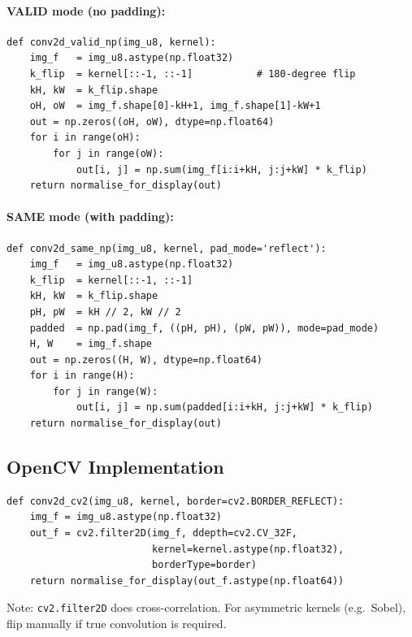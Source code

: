 \documentclass[12pt,a4paper]{article}
\begin{document}
\paragraph{VALID mode (no padding):}
\begin{lstlisting}
def conv2d_valid_np(img_u8, kernel):
    img_f   = img_u8.astype(np.float32)
    k_flip  = kernel[::-1, ::-1]           # 180-degree flip
    kH, kW  = k_flip.shape
    oH, oW  = img_f.shape[0]-kH+1, img_f.shape[1]-kW+1
    out = np.zeros((oH, oW), dtype=np.float64)
    for i in range(oH):
        for j in range(oW):
            out[i, j] = np.sum(img_f[i:i+kH, j:j+kW] * k_flip)
    return normalise_for_display(out)
\end{lstlisting}

\paragraph{SAME mode (with padding):}
\begin{lstlisting}
def conv2d_same_np(img_u8, kernel, pad_mode='reflect'):
    img_f   = img_u8.astype(np.float32)
    k_flip  = kernel[::-1, ::-1]
    kH, kW  = k_flip.shape
    pH, pW  = kH // 2, kW // 2
    padded  = np.pad(img_f, ((pH, pH), (pW, pW)), mode=pad_mode)
    H, W    = img_f.shape
    out = np.zeros((H, W), dtype=np.float64)
    for i in range(H):
        for j in range(W):
            out[i, j] = np.sum(padded[i:i+kH, j:j+kW] * k_flip)
    return normalise_for_display(out)
\end{lstlisting}

\subsection{OpenCV Implementation}
\begin{lstlisting}
def conv2d_cv2(img_u8, kernel, border=cv2.BORDER_REFLECT):
    img_f = img_u8.astype(np.float32)
    out_f = cv2.filter2D(img_f, ddepth=cv2.CV_32F,
                         kernel=kernel.astype(np.float32),
                         borderType=border)
    return normalise_for_display(out_f.astype(np.float64))
\end{lstlisting}

Note: \texttt{cv2.filter2D} does cross-correlation. For asymmetric kernels (e.g.\ Sobel),
flip manually if true convolution is required.
\end{document}
